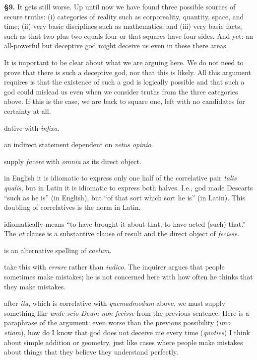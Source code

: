 \prenotes

\textbf{§9.} It gets still worse. Up until now we have found three possible sources of secure truths: (i) categories of reality such as corporeality, quantity, space, and time; (ii) very basic disciplines such as mathematics; and (iii) very basic facts, such as that two plus two equals four or that squares have four sides. And yet: an all-powerful but deceptive god might deceive us even in these there areas.

It is important to be clear about what we are arguing here. We do not need to prove that there is such a deceptive god, nor that this is likely. All this argument requires is that the existence of such a god is logically possible and that such a god could mislead us even when we consider truths from the three categories above. If this is the case, we are back to square one, left with no candidates for certainty at all.

 dative with \textit{infixa}.

 an indirect statement dependent on \textit{vetus opinio}.

 supply \textit{facere} with \textit{omnia} as its direct object.

 in English it is idiomatic to express only one half of the correlative pair \textit{talis qualis}, but in Latin it is idiomatic to express both halves. I.e., god made Descarts ``such as he is'' (in English), but ``of that sort which sort he is'' (in Latin). This doubling of correlatives is the norm in Latin.

 idiomatically means ``to have brought it about that, to have acted (such) that.'' The \textit{ut} clause is a substantive clause of result and the direct object of \textit{fecisse}.

 is an alternative spelling of \textit{caelum}.

 take this with \textit{errare} rather than \textit{iudico}. The inquirer argues that people sometimes make mistakes; he is not concerned here with how often he thinks that they make mistakes.

 after \textit{ita}, which is correlative with \textit{quemadmodum} above, we must supply something like \textit{unde scio Deum non fecisse} from the previous sentence. Here is a paraphrase of the argument: even worse than the previous possibility (\textit{imo etiam}), how do I know that god does not deceive me every time (\textit{quoties}) I think about simple addition or geometry, just like cases where people make mistakes about things that they believe they understand perfectly.

